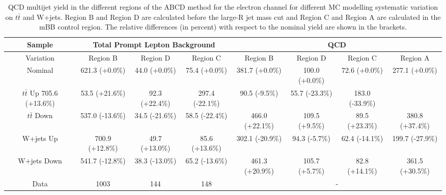 \begin{table}[htbp!]
\begin{tiny}
\begin{center}
\begin{tabular}{c|c|c|c||c|c|c|c}
Sample         &\multicolumn{3}{c||}{Total Prompt Lepton Background}      &\multicolumn{4}{c}{QCD}                                                  \\
\hline  
Variation      & Region B            & Region D        & Region C       & Region B        & Region D            & Region C          & Region A         \\ 
\hline  
Nominal        & 621.3 (+0.0\%)  & 44.0  (+0.0\%)  & 75.4 (+0.0\%)  & 381.7 (+0.0\%)  & 100.0  (+0.0\%)  & 72.6  (+0.0\%)  & 277.1     (+0.0\%) \\
\hline
$t\bar{t}$  Up     705.6   (+13.6\%) & 53.5  (+21.6\%) & 92.3 (+22.4\%) & 297.4 (-22.1\%) & 90.5   (-9.5\%)  & 55.7  (-23.3\%) & 183.0     (-33.9\%) \\  
$t\bar{t}$  Down   & 537.0 (-13.6\%) & 34.5  (-21.6\%) & 58.5 (-22.4\%) & 466.0 (+22.1\%) & 109.5  (+9.5\%)  & 89.5  (+23.3\%) & 380.8     (+37.4\%) \\  
W+jets      Up     & 700.9 (+12.8\%) & 49.7  (+13.0\%) & 85.6 (+13.6\%) & 302.1 (-20.9\%) & 94.3   (-5.7\%)  & 62.4  (-14.1\%) & 199.7     (-27.9\%) \\ 
W+jets      Down   & 541.7 (-12.8\%) & 38.3  (-13.0\%) & 65.2 (-13.6\%) & 461.3 (+20.9\%) & 105.7  (+5.7\%)  & 82.8  (+14.1\%) & 361.5     (+30.5\%) \\ 
\hline 
\hline 
Data           & 1003  & 144   & 148  &\multicolumn{4}{c}{-} \\
\hline  
\end{tabular}
\end{center}
\caption{QCD multijet yield in the different regions of the ABCD method for the electron channel for 
different MC modelling systematic variation on $t\bar{t}$ and W+jets. Region B and Region D are calculated 
before the large-R jet mass cut and Region C and Region A are calculated in the mBB control region. The relative 
differences (in percent) with respect to the nominal yield are shown in the brackets.} 
\label{tab:boosted_qcd_mcmodel_elec_mbbcr}
\end{tiny}
\end{table} 


%
%

